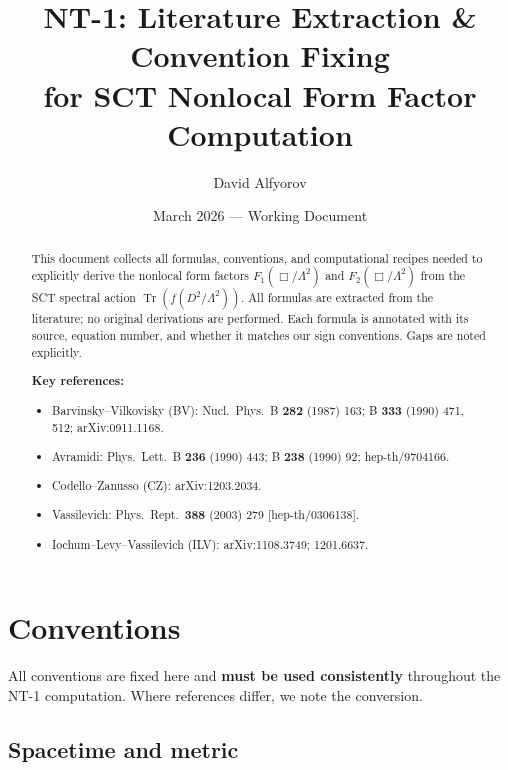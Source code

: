 \documentclass[12pt,a4paper]{article}
\title{\textbf{NT-1: Literature Extraction \& Convention Fixing\\[4pt]
       for SCT Nonlocal Form Factor Computation}}
\author{David Alfyorov}
\date{March 2026 --- Working Document}
\theoremstyle{definition}
\theoremstyle{remark}
\newcommand{\Tr}{\operatorname{Tr}}
\begin{document}
\maketitle

\begin{center}
\end{center}

\thispagestyle{empty}

\begin{abstract}
This document collects all formulas, conventions, and computational
recipes needed to explicitly derive the nonlocal form factors
$F_1(\Box/\Lambda^2)$ and $F_2(\Box/\Lambda^2)$ from the SCT spectral
action $\Tr(f(D^2/\Lambda^2))$.  All formulas are extracted from the
literature; no original derivations are performed.  Each formula is
annotated with its source, equation number, and whether it matches our
sign conventions.  Gaps are noted explicitly.

\medskip\noindent
\textbf{Key references:}
\begin{itemize}[nosep]
\item Barvinsky--Vilkovisky (BV): Nucl.\ Phys.\ B \textbf{282} (1987) 163;
  B \textbf{333} (1990) 471, 512; arXiv:0911.1168.
\item Avramidi: Phys.\ Lett.\ B \textbf{236} (1990) 443;
  B \textbf{238} (1990) 92; hep-th/9704166.
\item Codello--Zanusso (CZ): arXiv:1203.2034.
\item Vassilevich: Phys.\ Rept.\ \textbf{388} (2003) 279
  [hep-th/0306138].
\item Iochum--Levy--Vassilevich (ILV): arXiv:1108.3749; 1201.6637.
\end{itemize}
\end{abstract}

\tableofcontents
\newpage

\section{Conventions}
\label{sec:conventions}

All conventions are fixed here and \textbf{must be used consistently}
throughout the NT-1 computation.  Where references differ, we note the
conversion.

\subsection{Spacetime and metric}
\end{document}
